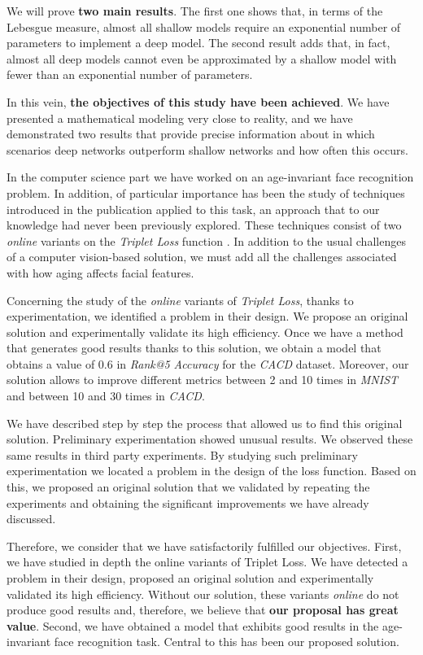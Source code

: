 We will prove \textbf{two main results}. The first one shows that, in terms of the Lebesgue measure, almost all shallow models require an exponential number of parameters to implement a deep model. The second result adds that, in fact, almost all deep models cannot even be approximated by a shallow model with fewer than an exponential number of parameters.

In this vein, \textbf{the objectives of this study have been achieved}. We have presented a mathematical modeling very close to reality, and we have demonstrated two results that provide precise information about in which scenarios deep networks outperform shallow networks and how often this occurs.

In the computer science part we have worked on an age-invariant face recognition problem. In addition, of particular importance has been the study of techniques introduced in the \cite{informatica:principal} publication applied to this task, an approach that to our knowledge had never been previously explored. These techniques consist of two \textit{online} variants on the \textit{Triplet Loss} function \cite{informatica:principal}. In addition to the usual challenges of a computer vision-based solution, we must add all the challenges associated with how aging affects facial features.

Concerning the study of the \textit{online} variants of \textit{Triplet Loss}, thanks to experimentation, we identified a problem in their design. We propose an original solution and experimentally validate its high efficiency. Once we have a method that generates good results thanks to this solution, we obtain a model that obtains a value of 0.6 in \textit{Rank@5 Accuracy} for the \textit{CACD} dataset. Moreover, our solution allows to improve different metrics between 2 and 10 times in \textit{MNIST} and between 10 and 30 times in \textit{CACD}.

We have described step by step the process that allowed us to find this original solution. Preliminary experimentation showed unusual results. We observed these same results in third party experiments. By studying such preliminary experimentation we located a problem in the design of the loss function. Based on this, we proposed an original solution that we validated by repeating the experiments and obtaining the significant improvements we have already discussed.

Therefore, we consider that we have satisfactorily fulfilled our objectives. First, we have studied in depth the online variants of Triplet Loss. We have detected a problem in their design, proposed an original solution and experimentally validated its high efficiency. Without our solution, these variants \textit{online} do not produce good results and, therefore, we believe that \textbf{our proposal has great value}. Second, we have obtained a model that exhibits good results in the age-invariant face recognition task. Central to this has been our proposed solution.

\endinput
